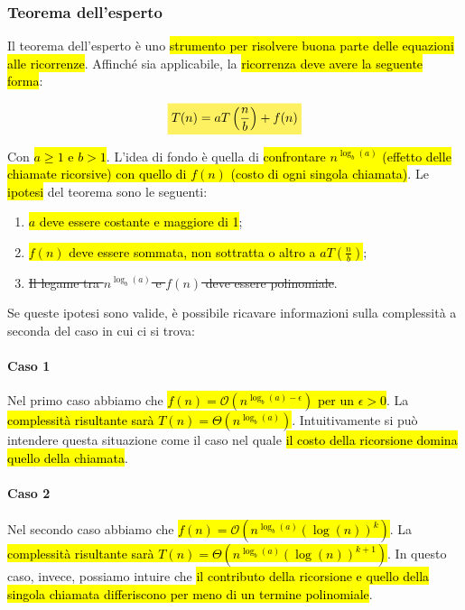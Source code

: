 \documentclass[a4paper,11pt,twoside]{article}
\theoremstyle{plain}
\theoremstyle{definition}
\theoremstyle{remark}
\newcommand{\mhl}[1]{\colorbox{hlcolor}{$\displaystyle #1$}}
\begin{document}
\subsubsection{Teorema dell'esperto}\label{sec:alg-ricorsivi-esperto}

Il teorema dell'esperto è uno \hl{strumento per risolvere buona parte delle
equazioni alle ricorrenze}. Affinché sia applicabile, la \hl{ricorrenza deve
avere la seguente forma}:

\begin{equation}
  \mhl{
    T(n) = aT\left(\frac{n}{b}\right) + f(n)
  }
\end{equation}

Con \hl{$a \geq 1$ e $b>1$}. L'idea di fondo è quella di \hl{confrontare
$n^{\log_b(a)}$ (effetto delle chiamate ricorsive) con quello di $f(n)$ (costo
di ogni singola chiamata)}. Le \hl{ipotesi} del teorema sono le seguenti:

\begin{enumerate}
  \item \hl{$a$ deve essere costante e maggiore di 1};
  \item \hl{$f(n)$ deve essere sommata, non sottratta o altro a
    $aT(\frac{n}{b})$};
  \item \st{Il legame tra $n^{\log_b(a)}$ e $f(n)$ deve essere polinomiale}.
\end{enumerate}

Se queste ipotesi sono valide, è possibile ricavare informazioni sulla
complessità a seconda del caso in cui ci si trova:

\paragraph{Caso 1} Nel primo caso abbiamo che \hl{$f(n) =
\mathcal{O}(n^{\log_b(a) - \epsilon})$ per un $\epsilon>0$}. La \hl{complessità
risultante sarà $T(n) = \Theta(n^{\log_b(a)})$}. Intuitivamente si può intendere
questa situazione come il caso nel quale \hl{il costo della ricorsione domina
quello della chiamata}.

\paragraph{Caso 2} Nel secondo caso abbiamo che \hl{$f(n) =
\mathcal{O}(n^{\log_b(a)}{(\log(n))}^k)$}. La \hl{complessità risultante sarà
$T(n) = \Theta(n^{\log_b(a)}{(\log(n))}^{k+1})$}. In questo caso, invece,
possiamo intuire che \hl{il contributo della ricorsione e quello della singola
chiamata differiscono per meno di un termine polinomiale}.
\end{document}
